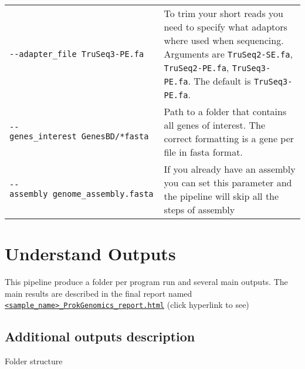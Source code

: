 \documentclass[
]{book}
\begin{document}
\begin{longtable}[]{@{}
  >{\raggedright\arraybackslash}p{}
  >{\raggedright\arraybackslash}p{}@{}}
\texttt{-\/-adapter\_file\ TruSeq3-PE.fa} & To trim your short reads you need to specify what adaptors where used when sequencing. Arguments are \texttt{TruSeq2-SE.fa}, \texttt{TruSeq2-PE.fa}, \texttt{TruSeq3-PE.fa}. The default is \texttt{TruSeq3-PE.fa}. \\
\texttt{-\/-genes\_interest\ GenesBD/*fasta} & Path to a folder that contains all genes of interest. The correct formatting is a gene per file in fasta format. \\
\texttt{-\/-assembly\ genome\_assembly.fasta} & If you already have an assembly you can set this parameter and the pipeline will skip all the steps of assembly \\
\end{longtable}

\hypertarget{understand-outputs}{%
\chapter{Understand Outputs}\label{understand-outputs}}

This pipeline produce a folder per program run and several main outputs. The main results are described in the final report named \href{https://bioinformatics.erc.monash.edu/home/lper0012/ProkGenomics/1-77321-LFA6246_L2_ProkGenomics_report.html}{\texttt{\textless{}sample\_name\textgreater{}\_ProkGenomics\_report.html}} (click hyperlink to see)

\hypertarget{additional-outputs-description}{%
\section{Additional outputs description}\label{additional-outputs-description}}

Folder structure
\end{document}
